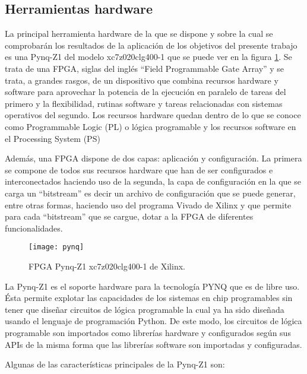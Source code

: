
\subsection{Herramientas hardware} \label{herraminetas_hardware}
La principal herramienta hardware de la que se dispone y sobre la cual se comprobarán los resultados de la aplicación de los objetivos del presente trabajo es una Pynq-Z1\cite{pynq} del modelo xc7z020clg400-1 que se puede ver en la figura \ref{fig:pynq}. Se trata de una FPGA, siglas del inglés ``Field Programmable Gate Array'' y se trata, a grandes rasgos, de un dispositivo que combina recursos hardware y software para aprovechar la potencia de la ejecución en paralelo de tareas del primero y la flexibilidad, rutinas software y tareas relacionadas con sistemas operativos del segundo. Los recursos hardware quedan dentro de lo que se conoce como Programmable Logic (PL) o lógica programable y los recursos software en el Processing System (PS)

Además, una FPGA dispone de dos capas: aplicación y configuración. La primera se compone de todos sus recursos hardware que han de ser configurados e interconectados haciendo uso de la segunda, la capa de configuración en la que se carga un ``bitstream'' es decir un archivo de configuración que se puede generar, entre otras formas, haciendo uso del programa Vivado de Xilinx y que permite para cada ``bitstream'' que se cargue, dotar a la FPGA de diferentes funcionalidades.



\begin{figure}[H]
\centering
\texttt{[image: pynq]}
  \caption{FPGA Pynq-Z1 xc7z020clg400-1 de Xilinx.}\label{fig:pynq}
\end{figure}

La Pynq-Z1 es el soporte hardware para la tecnología PYNQ que es de libre uso. Ésta permite explotar las capacidades de los sistemas en chip programables sin tener que diseñar circuitos de lógica programable la cual ya ha sido diseñada usando el lenguaje de programación Python. De este modo, los circuitos de lógica programable son importados como librerías hardware y configurados según sus APIs de la misma forma que las librerías software son importadas y configuradas.

Algunas de las características principales de la Pynq-Z1 son:

